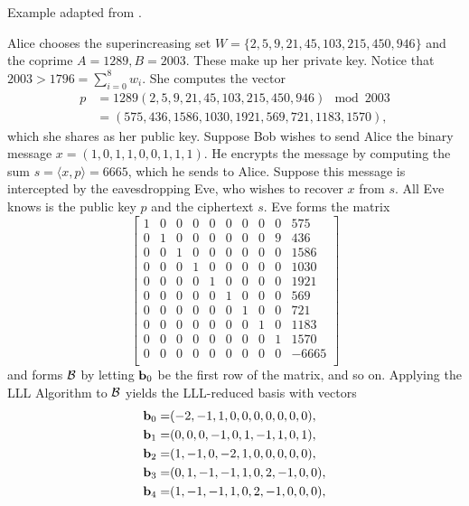 \documentclass[a4paper,12pt]{article}
\begin{document}
\begin{ex}
    Example adapted from \cite{Bakker}. 
    
    Alice chooses the superincreasing set $W = \lbrace 2,5,9,21,45,103,215,450,946\rbrace$ and the coprime $A=1289, B=2003$. These make up her private key. Notice that $2003 > 1796 = \sum_{i=0}^{8}w_i$. She computes the vector \begin{align*}
        p &= 1289(2,5,9,21,45,103,215,450,946) \mod 2003 \\
        &= (575, 436, 1586, 1030, 1921, 569, 721, 1183, 1570),
    \end{align*} which she shares as her public key. Suppose Bob wishes to send Alice the binary message $x = (1,0,1,1,0,0,1,1,1)$. He encrypts the message by computing the sum $s = \langle x,p\rangle = 6665$, which he sends to Alice. Suppose this message is intercepted by the eavesdropping Eve, who wishes to recover $x$ from $s$. All Eve knows is the public key $p$ and the ciphertext $s$. Eve forms the matrix 
    $$
    \begin{bmatrix}
        1& 0& 0& 0& 0& 0& 0& 0& 0& 575\\
        0& 1& 0& 0& 0& 0& 0& 0& 9& 436\\
        0& 0& 1& 0& 0& 0& 0& 0& 0& 1586\\
        0& 0& 0& 1& 0& 0& 0& 0& 0& 1030\\
        0& 0& 0& 0& 1& 0& 0& 0& 0& 1921\\
        0& 0& 0& 0& 0& 1& 0& 0& 0& 569\\
        0& 0& 0& 0& 0& 0& 1& 0& 0& 721\\
        0& 0& 0& 0& 0& 0& 0& 1& 0& 1183\\
        0& 0& 0& 0& 0& 0& 0& 0& 1& 1570\\
        0& 0& 0& 0& 0& 0& 0& 0& 0& -6665\\
    \end{bmatrix}
    $$
    and forms $\mathcal{B}$ by letting $\mathbf{b}_0$ be the first row of the matrix, and so on. Applying the LLL Algorithm to $\mathcal{B}$ yields the LLL-reduced basis with vectors  
    \begin{align*}
        \ba_0 =& ( -2,-1,1,0,0,0,0,0,0,0), \\
        \ba_1 =& ( 0,0,0,-1,0,1,-1,1,0,1), \\ 
        \ba_2 =& ( 1,-1,0,-2,1,0,0,0,0,0), \\ 
        \ba_3 =& ( 0,1,-1,-1,1,0,2,-1,0,0), \\ 
        \ba_4 =& ( 1,-1,-1,1,0,2,-1,0,0,0), \\ 

\end{align*}
\end{ex}
\end{document}
